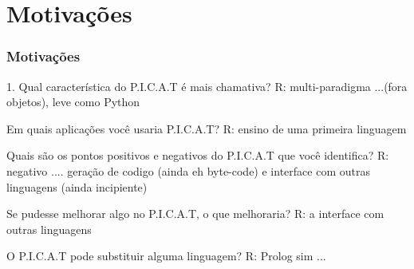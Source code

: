 \documentclass[sans]{beamer}
\begin{document}
\section{Motivações}
\begin{frame}[fragile]
\frametitle{Motivações}


1. Qual característica do P.I.C.A.T é mais chamativa?
R: multi-paradigma ...(fora objetos), leve  como Python

Em quais aplicações você usaria P.I.C.A.T?
R: ensino de uma primeira linguagem 

Quais são os pontos positivos e negativos do P.I.C.A.T que você identifica?
R: negativo .... geração de codigo (ainda eh byte-code) e interface com outras linguagens (ainda incipiente)

Se pudesse melhorar algo no P.I.C.A.T, o que melhoraria?
R: a interface com outras linguagens 

O P.I.C.A.T pode substituir alguma linguagem?
R: Prolog sim ...

\end{frame}
\end{document}
